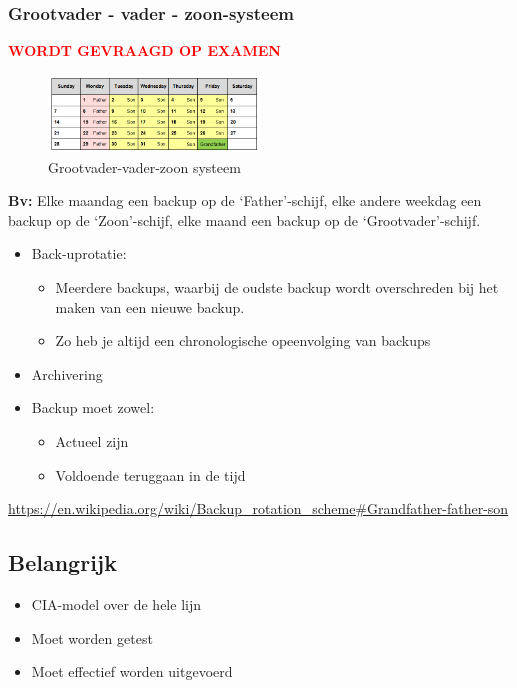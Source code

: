 \documentclass{article}
\newcommand{\bold}[1]{\textbf{#1}}
\begin{document}
\subsubsection{Grootvader - vader - zoon-systeem}

\textcolor{red}{\bold{WORDT GEVRAAGD OP EXAMEN}}

\begin{figure}[H]
    \centering
    \includegraphics[width=0.5\textwidth]{gfs.png}
    \caption{Grootvader-vader-zoon systeem}
\end{figure}

\bold{Bv:} Elke maandag een backup op de `Father'-schijf, elke andere weekdag een backup op de `Zoon'-schijf, elke maand een backup op de `Grootvader'-schijf.

\begin{itemize}
    \item Back-uprotatie:
    \begin{itemize}
        \item Meerdere backups, waarbij de oudste backup wordt overschreden bij het maken van een nieuwe backup.
        \item Zo heb je altijd een chronologische opeenvolging van backups
    \end{itemize}
    \item Archivering
    \item Backup moet zowel:
    \begin{itemize}
        \item Actueel zijn
        \item Voldoende teruggaan in de tijd
    \end{itemize}
\end{itemize}

\url{https://en.wikipedia.org/wiki/Backup_rotation_scheme#Grandfather-father-son}

\subsection{Belangrijk}

\begin{itemize}
    \item CIA-model over de hele lijn
    \item Moet worden getest
    \item Moet effectief worden uitgevoerd
\end{itemize}
\end{document}
